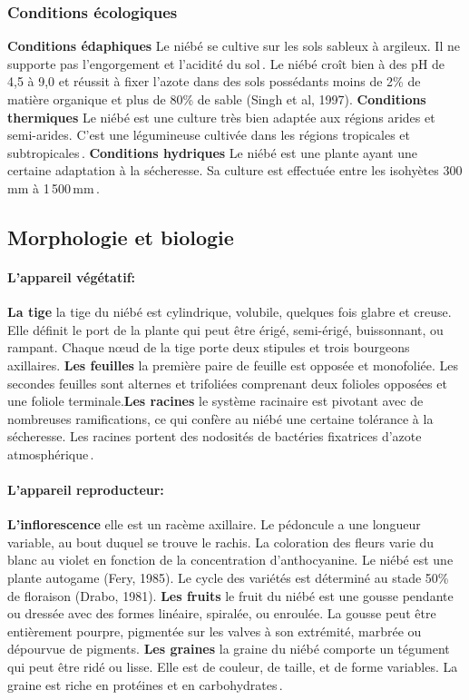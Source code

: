 \documentclass[a4paper,11pt]{article}
\begin{document}
\subsubsection{Conditions écologiques}

\textbf{Conditions édaphiques} Le niébé se cultive sur les sols
sableux à argileux. Il ne supporte pas l’engorgement et l’acidité du
sol\,\cite{Doggett_1988}. Le niébé croît bien à des pH de 4,5 à 9,0 et
réussit à fixer l’azote dans des sols possédants moins de 2\% de
matière organique et plus de 80\% de sable (Singh et al,
1997). \textbf{Conditions thermiques} Le niébé est
une culture très bien adaptée aux régions arides et semi-arides. C’est
une légumineuse cultivée dans les régions tropicales et
subtropicales\,\cite{Doggett_1988}. \textbf{Conditions hydriques} Le
niébé est une plante ayant une certaine adaptation à la sécheresse. Sa
culture est effectuée entre les isohyètes 300\,mm à
1\,500\,mm\,\cite{Doggett_1988}.

\subsection{Morphologie et biologie}

  
\paragraph{L’appareil végétatif:}

\textbf{La tige} la tige du niébé est cylindrique, volubile, quelques fois
glabre et creuse. Elle définit le port de la plante qui peut être
érigé, semi-érigé, buissonnant, ou rampant. Chaque nœud de la tige
porte deux stipules et trois bourgeons axillaires. \textbf{Les feuilles} la
première paire de feuille est opposée et monofoliée. Les secondes
feuilles sont alternes et trifoliées comprenant deux folioles opposées
et une foliole terminale.\textbf{Les racines} le système racinaire est
pivotant avec de nombreuses ramifications, ce qui confère au niébé une
certaine tolérance à la sécheresse. Les racines portent des nodosités
de bactéries fixatrices d’azote atmosphérique\,\cite{Doggett_1988}.



\paragraph{L’appareil reproducteur:}

\textbf{L’inflorescence} elle est un racème axillaire. Le pédoncule a une
longueur variable, au bout duquel se trouve le rachis. La coloration
des fleurs varie du blanc au violet en fonction de la concentration
d’anthocyanine. Le niébé est une plante autogame (Fery, 1985). Le cycle des
variétés est déterminé au stade 50\% de floraison (Drabo,
1981). \textbf{Les fruits} le fruit du niébé est une gousse pendante ou
dressée avec des formes linéaire, spiralée, ou enroulée. La gousse
peut être entièrement pourpre, pigmentée sur les valves à son
extrémité, marbrée ou dépourvue de pigments. \textbf{Les graines} la graine
du niébé comporte un tégument qui peut être ridé ou lisse. Elle est de
couleur, de taille, et de forme variables. La graine est riche en
protéines et en carbohydrates\,\cite{Doggett_1988}.
\end{document}
